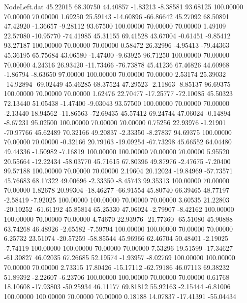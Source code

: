 \begin{filecontents}{NodeLeft.dat}
  45.22015   68.30750   44.40857    -1.83213   -8.38581   93.68125  100.00000   70.00000   70.00000    1.69250   25.59143  -14.60896  -66.86642
  45.27092   68.50891   47.42920    -1.36657   -9.28112   93.67500  100.00000   70.00000   70.00000    1.49109   22.57080  -10.95770  -74.41985
  45.31155   69.41528   43.67004    -0.61451   -9.85412   93.27187  100.00000   70.00000   70.00000    0.58472   26.32996   -4.95413  -79.44363
  45.36195   65.75684   43.06580    -1.47400   -9.63925   96.71250  100.00000   70.00000   70.00000    4.24316   26.93420  -11.73466  -76.73878
  45.41236   67.46826   44.60968    -1.86794   -8.63650   97.00000  100.00000   70.00000   70.00000    2.53174   25.39032  -14.92894  -69.02449
  45.46285   68.37524   47.29523    -2.11863   -8.85137   96.69375  100.00000   70.00000   70.00000    1.62476   22.70477  -17.25777  -72.10085
  45.50323   72.13440   51.05438    -1.47400   -9.03043   93.57500  100.00000   70.00000   70.00000   -2.13440   18.94562  -11.86563  -72.69435
  45.57412   69.24744   47.06024    -0.14894   -8.67231   95.02500  100.00000   70.00000   70.00000    0.75256   22.93976   -1.21901  -70.97766
  45.62489   70.32166   49.20837    -2.33350   -8.27837   94.69375  100.00000   70.00000   70.00000   -0.32166   20.79163  -19.09254  -67.73298
  45.66552   64.04480   49.44336    -1.50982   -7.16819  100.00000  100.00000   70.00000   70.00000    5.95520   20.55664  -12.22434  -58.03770
  45.71615   67.80396   49.87976    -2.47675   -7.20400   99.57188  100.00000   70.00000   70.00000    2.19604   20.12024  -19.84969  -57.73571
  45.76683   68.17322   49.00696    -2.33350   -8.45743   99.35313  100.00000   70.00000   70.00000    1.82678   20.99304  -18.46277  -66.91554
  45.80740   66.39465   48.77197    -2.58419   -7.92025  100.00000  100.00000   70.00000   70.00000    3.60535   21.22803  -20.10252  -61.61192
  45.85814   65.25330   47.06024    -2.79907   -8.42162  100.00000  100.00000   70.00000   70.00000    4.74670   22.93976  -21.77360  -65.51080
  45.90888   63.74268   46.48926    -2.65582   -7.59794  100.00000  100.00000   70.00000   70.00000    6.25732   23.51074  -20.57259  -58.85544
  45.96966   62.46704   50.48401    -2.19025   -7.74119  100.00000  100.00000   70.00000   70.00000    7.53296   19.51599  -17.34627  -61.30827
  46.02035   67.26685   52.19574    -1.93957   -8.02769  100.00000  100.00000   70.00000   70.00000    2.73315   17.80426  -15.17112  -62.79186
  46.07113   69.38232   51.89392    -2.22607   -6.23706  100.00000  100.00000   70.00000   70.00000    0.61768   18.10608  -17.93803  -50.25934
  46.11177   69.81812   55.92163    -2.15444   -6.81006  100.00000  100.00000   70.00000   70.00000    0.18188   14.07837  -17.41391  -55.04434

\end{filecontents}
